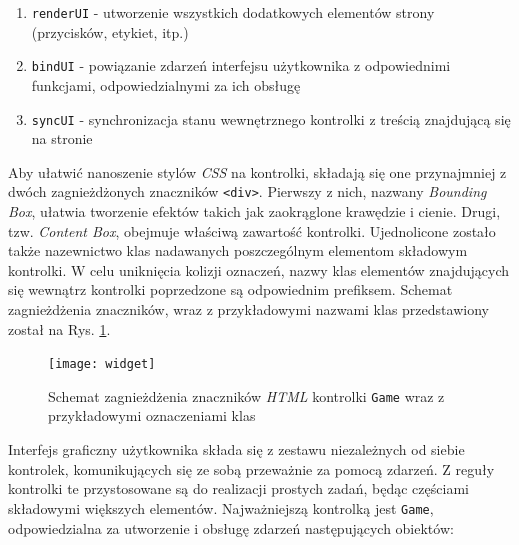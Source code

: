 \documentclass[11pt,twoside]{report}
\providecommand{\imref}[1]{Rys. \ref{#1}} %
\begin{document}
\begin{enumerate}
\item \texttt{renderUI} - utworzenie wszystkich dodatkowych elementów
  strony (przycisków, etykiet, itp.)
\item \texttt{bindUI} - powiązanie zdarzeń interfejsu użytkownika z
  odpowiednimi funkcjami, odpowiedzialnymi za ich obsługę
\item \texttt{syncUI} - synchronizacja stanu wewnętrznego kontrolki z
  treścią znajdującą się na stronie
\end{enumerate}

Aby ułatwić nanoszenie stylów \emph{CSS} na kontrolki, składają się
one przynajmniej z dwóch zagnieżdżonych znaczników
\texttt{<div>}. Pierwszy z nich, nazwany \emph{Bounding Box}, ułatwia
tworzenie efektów takich jak zaokrąglone krawędzie i cienie. Drugi,
tzw. \emph{Content Box}, obejmuje właściwą zawartość
kontrolki. Ujednolicone zostało także nazewnictwo klas nadawanych
poszczególnym elementom składowym kontrolki. W celu uniknięcia kolizji
oznaczeń, nazwy klas elementów znajdujących się wewnątrz kontrolki
poprzedzone są odpowiednim prefiksem. Schemat zagnieżdżenia
znaczników, wraz z przykładowymi nazwami klas przedstawiony został na
\imref{fig:widget}.

\begin{figure}[ht]
  \begin{center}
    \texttt{[image: widget]}
  \end{center}
  \caption{Schemat zagnieżdżenia znaczników \emph{HTML} kontrolki
    \texttt{Game} wraz z przykładowymi oznaczeniami klas}
  \label{fig:widget}
\end{figure}

Interfejs graficzny użytkownika składa się z zestawu niezależnych od
siebie kontrolek, komunikujących się ze sobą przeważnie za pomocą
zdarzeń. Z reguły kontrolki te przystosowane są do realizacji prostych
zadań, będąc częściami składowymi większych elementów. Najważniejszą
kontrolką jest \texttt{Game}, odpowiedzialna za utworzenie i obsługę
zdarzeń następujących obiektów:
\end{document}
